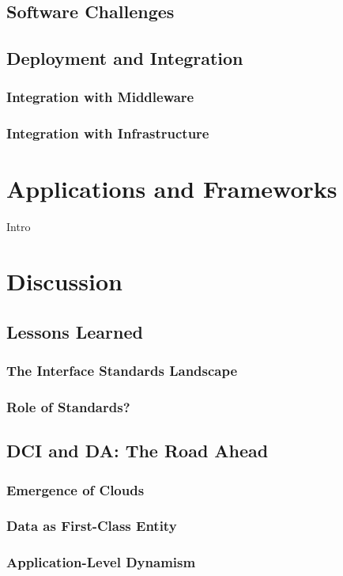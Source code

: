 \documentclass[a4paper,10pt]{article}
\begin{document}
\subsection{Software Challenges}

\subsection{Deployment and Integration} 

\subsubsection{Integration with Middleware}
\subsubsection{Integration with Infrastructure}


\section{Applications and Frameworks}
\label{apps_and_frameworks}

Intro

\section{Discussion}

\subsection{Lessons Learned}

\subsubsection{The Interface Standards Landscape}\label{interface_landscape}
\subsubsection{Role of Standards?}

\subsection{DCI and DA: The Road Ahead}

\subsubsection{Emergence of Clouds}

\subsubsection{Data as First-Class Entity}

\subsubsection{Application-Level Dynamism}

 
\end{document}
